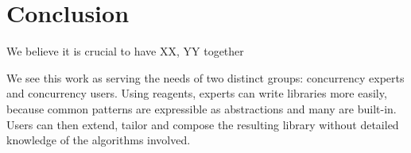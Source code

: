 \documentclass[preprint,nocopyrightspace]{sigplanconf}
\begin{document}
\section{Conclusion}

We believe it is crucial to have XX, YY together

We see this work as serving the needs of two distinct groups: concurrency
experts and concurrency users.  Using reagents, experts can write libraries more
easily, because common patterns are expressible as abstractions and many are
built-in.  Users can then extend, tailor and compose the resulting library
without detailed knowledge of the algorithms involved.



\end{document}
